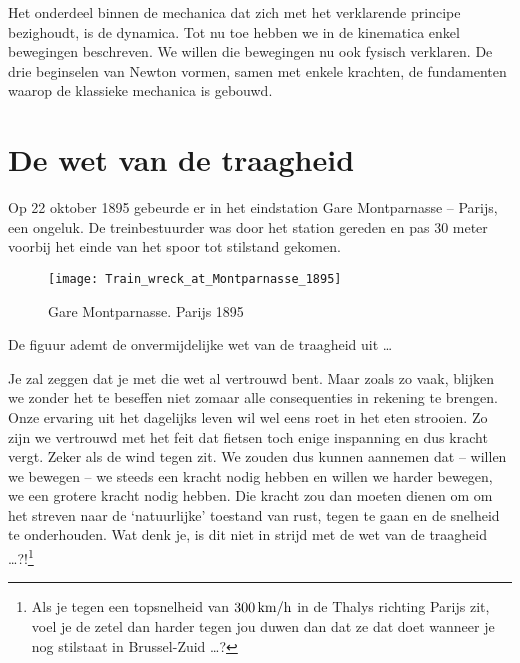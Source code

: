 \documentclass{ximera}
\begin{document}
	\author{Bart Lambregs}


	Het onderdeel binnen de mechanica dat zich met het verklarende principe bezighoudt, is de dynamica. Tot nu toe hebben we in de kinematica enkel bewegingen beschreven. We willen die bewegingen nu ook fysisch verklaren. De drie beginselen van Newton vormen, samen met enkele krachten, de fundamenten waarop de klassieke mechanica is gebouwd. 

	\newpage
	
	

	
	\section{De wet van de traagheid}
	
	Op 22 oktober 1895 gebeurde er in het eindstation Gare Montparnasse -- Parijs, een ongeluk. De treinbestuurder was door het station gereden en pas 30 meter voorbij het einde van het spoor tot stilstand gekomen.
	\begin{figure}[h]
	\begin{center}
	\texttt{[image: Train\_wreck\_at\_Montparnasse\_1895]}
	\caption{Gare Montparnasse. Parijs 1895}
	\end{center}
	\end{figure}
	
	De figuur ademt de onvermijdelijke wet van de traagheid uit \ldots
	\newline
	
	Je zal zeggen dat je met die wet al vertrouwd bent. Maar zoals zo vaak, blijken we zonder het te beseffen niet zomaar alle consequenties in rekening te brengen. Onze ervaring uit het dagelijks leven
	wil wel eens roet in het eten strooien. Zo zijn we vertrouwd met het feit dat
	fietsen toch enige inspanning en dus kracht vergt. Zeker als de wind tegen zit.
	We zouden dus kunnen aannemen dat -- willen we bewegen -- we steeds een kracht nodig
	hebben en willen we harder bewegen, we een grotere kracht nodig hebben. Die kracht zou dan moeten dienen om om het streven naar de `natuurlijke' toestand van rust, tegen te gaan en de snelheid te onderhouden. Wat denk je, is dit niet in strijd met de wet van de traagheid \ldots?!\footnote{Als je tegen een topsnelheid van $300\rm\,km/h$ in de Thalys richting Parijs zit, voel je de zetel dan harder tegen jou duwen dan dat ze dat doet wanneer je nog stilstaat in Brussel-Zuid \ldots?}
	
\end{document}
